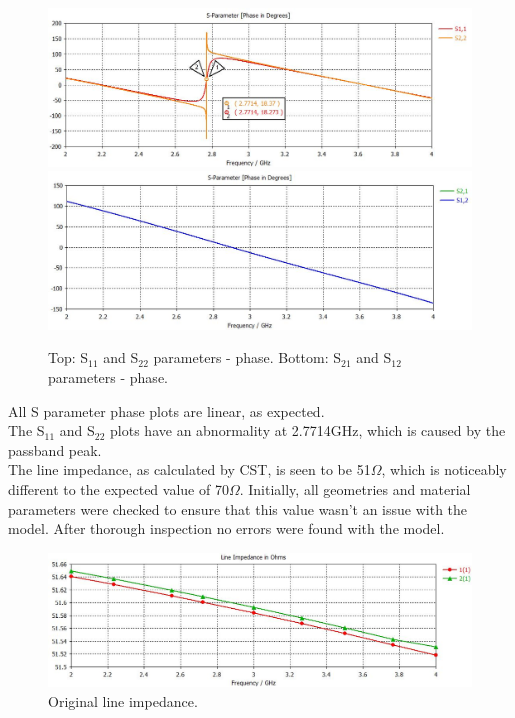 \documentclass{paper}
\begin{document}
\begin{figure}[H]
	\centering
	\includegraphics[scale=0.4]{IMG/S11_and_S22_phase}
	\includegraphics[scale=0.4]{IMG/S21_and_S12_phase}
	\caption{Top: S$_{11}$ and S$_{22}$ parameters - phase. Bottom: S$_{21}$ and S$_{12}$ parameters - phase.}
	\label{fig:s11_s22_s21_s12_phase}
\end{figure}

All S parameter phase plots are linear, as expected. \\

The S$_{11}$ and S$_{22}$ plots have an abnormality at 2.7714GHz, which is caused by the passband peak.\\

The line impedance, as calculated by CST, is seen to be 51$\Omega$, which is noticeably different to the expected value of 70$\Omega$. Initially, all geometries and material parameters were checked to ensure that this value wasn't an issue with the model. After thorough inspection no errors were found with the model.\\

\begin{figure}[H]
	\centering
	\includegraphics[scale=0.4]{IMG/51ohm}
	\caption{Original line impedance.}
	\label{fig:orig_line_imp}
\end{figure}
\end{document}
